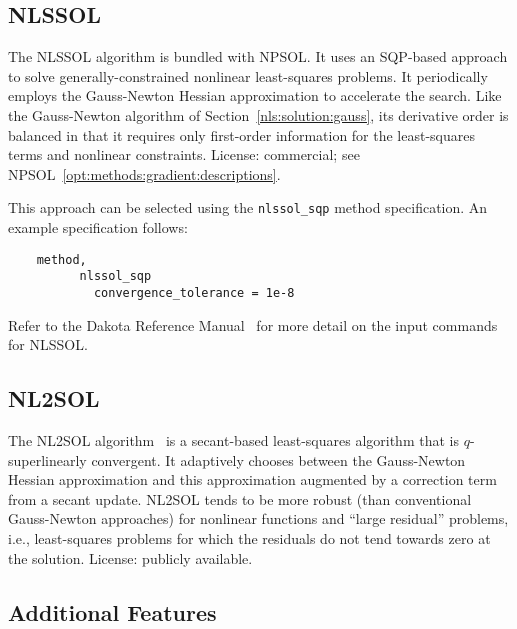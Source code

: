 \subsection{NLSSOL}\label{nls:solution:nlssol}

The NLSSOL algorithm is bundled with NPSOL. It uses an SQP-based
approach to solve generally-constrained nonlinear least-squares
problems. It periodically employs the Gauss-Newton Hessian
approximation to accelerate the search. Like the Gauss-Newton
algorithm of Section~\ref{nls:solution:gauss}, its derivative order is
balanced in that it requires only first-order information for the
least-squares terms and nonlinear constraints. License: commercial;
see NPSOL~\ref{opt:methods:gradient:descriptions}.

This approach can be selected using the \texttt{nlssol\_sqp} method
specification. An example specification follows:
\begin{small}
\begin{verbatim}
    method,
          nlssol_sqp
            convergence_tolerance = 1e-8
\end{verbatim}
\end{small}

Refer to the Dakota Reference Manual~\cite{RefMan} for more detail on the
input commands for NLSSOL.

\subsection{NL2SOL}\label{nls:solution:nl2sol}

The NL2SOL algorithm~\cite{Den81} is a secant-based least-squares
algorithm that is $q$-superlinearly convergent. It adaptively chooses
between the Gauss-Newton Hessian approximation and this approximation
augmented by a correction term from a secant update. NL2SOL tends to
be more robust (than conventional Gauss-Newton approaches) for
nonlinear functions and ``large residual'' problems, i.e.,
least-squares problems for which the residuals do not tend towards
zero at the solution. License: publicly available.

\subsection{Additional Features}\label{nls:solution:future}

